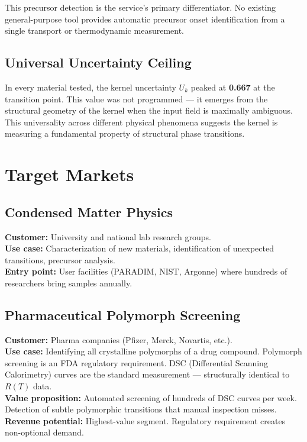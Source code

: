 \documentclass[11pt,letterpaper]{article}
\begin{document}
This precursor detection is the service's primary differentiator. No
existing general-purpose tool provides automatic precursor onset
identification from a single transport or thermodynamic measurement.

\subsection{Universal Uncertainty Ceiling}

In every material tested, the kernel uncertainty $U_k$ peaked at
\textbf{0.667} at the transition point. This value was not programmed
--- it emerges from the structural geometry of the kernel when the
input field is maximally ambiguous. This universality across different
physical phenomena suggests the kernel is measuring a fundamental
property of structural phase transitions.

\section{Target Markets}

\subsection{Condensed Matter Physics}

\textbf{Customer:} University and national lab research groups. \\
\textbf{Use case:} Characterization of new materials, identification of
  unexpected transitions, precursor analysis. \\
\textbf{Entry point:} User facilities (PARADIM, NIST, Argonne) where
  hundreds of researchers bring samples annually.

\subsection{Pharmaceutical Polymorph Screening}

\textbf{Customer:} Pharma companies (Pfizer, Merck, Novartis, etc.). \\
\textbf{Use case:} Identifying all crystalline polymorphs of a drug
  compound. Polymorph screening is an FDA regulatory requirement.
  DSC (Differential Scanning Calorimetry) curves are the standard
  measurement --- structurally identical to $R(T)$ data. \\
\textbf{Value proposition:} Automated screening of hundreds of DSC
  curves per week. Detection of subtle polymorphic transitions that
  manual inspection misses. \\
\textbf{Revenue potential:} Highest-value segment. Regulatory
  requirement creates non-optional demand.
\end{document}
